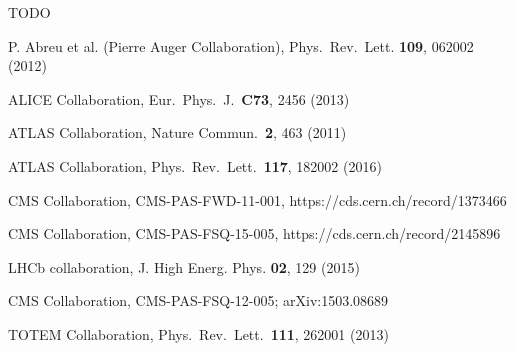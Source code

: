 \documentclass{webofc}
\begin{document}
\begin{thebibliography}{}
	TODO

	P. Abreu et al. (Pierre Auger Collaboration), Phys.~Rev.~Lett. \textbf{109}, 062002 (2012)

	ALICE Collaboration, Eur.~Phys.~J.~\textbf{C73}, 2456 (2013)

	ATLAS Collaboration, Nature Commun.~\textbf{2}, 463 (2011)

	ATLAS Collaboration, Phys.~Rev.~Lett.~\textbf{117}, 182002 (2016)

	CMS Collaboration, CMS-PAS-FWD-11-001, https://cds.cern.ch/record/1373466

	CMS Collaboration, CMS-PAS-FSQ-15-005, https://cds.cern.ch/record/2145896

	LHCb collaboration, J. High Energ. Phys. \textbf{02}, 129 (2015)

	CMS Collaboration, CMS-PAS-FSQ-12-005; arXiv:1503.08689

	TOTEM Collaboration, Phys.~Rev.~Lett.~\textbf{111}, 262001 (2013)


\end{thebibliography}
\end{document}
